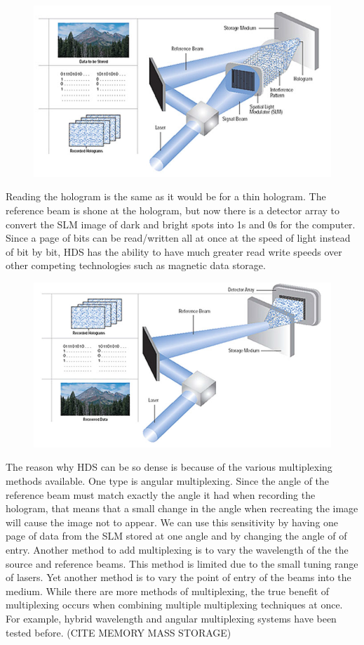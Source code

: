 \documentclass[ aip, 12pt]{revtex4-1} %
\begin{document}
\begin{figure}[H]
\centerline{\includegraphics[scale=.45]{dataHologramCreate.png}}
\caption{ }
\label{dataHologramCreate}
\end{figure} 
Reading the hologram is the same as it would be for a thin hologram. The reference beam is shone at the hologram, but now there is a detector array to convert the SLM image of dark and bright spots into 1s and 0s for the computer. Since a page of bits can be read/written all at once at the speed of light instead of bit by bit, HDS has the ability to have much greater read write speeds over other competing technologies such as magnetic data storage.
\begin{figure}[H]
\centerline{\includegraphics[scale=.45]{dataHologramReconstruct.png}}
\caption{ }
\label{dataHologramReconstruct}
\end{figure} 
The reason why HDS can be so dense is because of the various multiplexing methods available. One type is angular multiplexing. Since the angle of the reference beam must match exactly the angle it had when recording the hologram, that means that a small change in the angle when recreating the image will cause the image not to appear. We can use this sensitivity by having one page of data from the SLM stored at one angle and by changing the angle of of entry. Another method to add multiplexing is to vary the wavelength of the the source and reference beams. This method is limited due to the small tuning range of lasers. Yet another method is to vary the point of entry of the beams into the medium. While there are more methods of multiplexing, the true benefit of multiplexing occurs when combining multiple multiplexing techniques at once. For example, hybrid wavelength and angular multiplexing systems have been tested before. (CITE MEMORY MASS STORAGE)
\end{document}
